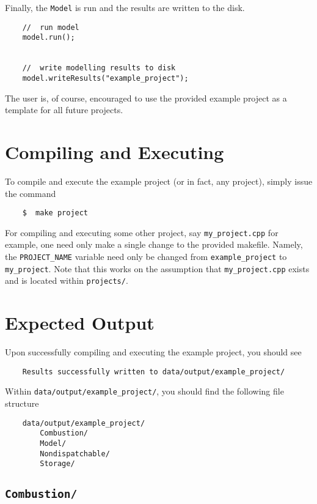 \documentclass[12pt, letterpaper]{report}
\begin{document}
\noindent Finally, the \texttt{Model} is run and the results are written to the disk.

\begin{verbatim}
    //  run model
    model.run();

    
    //  write modelling results to disk
    model.writeResults("example_project");
\end{verbatim}

\noindent The user is, of course, encouraged to use the provided example project as a template for all future projects.

\section{Compiling and Executing}

To compile and execute the example project (or in fact, any project), simply issue the command

\begin{verbatim}
    $  make project
\end{verbatim}

\noindent For compiling and executing some other project, say \texttt{my\_project.cpp} for example, one need only make a single change to the provided makefile. Namely, the \texttt{PROJECT\_NAME} variable need only be changed from \texttt{example\_project} to \texttt{my\_project}. Note that this works on the assumption that \texttt{my\_project.cpp} exists and is located within \texttt{projects/}.

\section{Expected Output}

Upon successfully compiling and executing the example project, you should see

\begin{verbatim}
    Results successfully written to data/output/example_project/
\end{verbatim}

\noindent Within \texttt{data/output/example\_project/}, you should find the following file structure

\begin{verbatim}
    data/output/example_project/
        Combustion/
        Model/
        Nondispatchable/
        Storage/
\end{verbatim}

\subsection{\texttt{Combustion/}}
\end{document}
